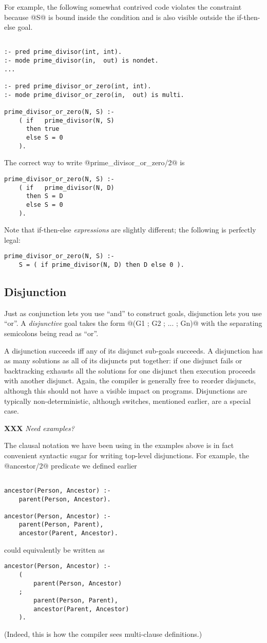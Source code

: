 \documentclass[a4paper,11pt,notitlepage,onecolumn]{article}
\newcommand{\XXX}[1]%
{{\small\textbf{XXX} \emph{#1}}}
\begin{document}
For example, the following somewhat contrived code violates
the constraint because @S@ is bound inside the condition and is
also visible outside the if-then-else goal.
\begin{verbatim}

:- pred prime_divisor(int, int).
:- mode prime_divisor(in,  out) is nondet.
...

:- pred prime_divisor_or_zero(int, int).
:- mode prime_divisor_or_zero(in,  out) is multi.

prime_divisor_or_zero(N, S) :-
    ( if   prime_divisor(N, S)
      then true
      else S = 0
    ).

\end{verbatim}
The correct way to write @prime_divisor_or_zero/2@ is
\begin{verbatim}
prime_divisor_or_zero(N, S) :-
    ( if   prime_divisor(N, D)
      then S = D
      else S = 0
    ).
\end{verbatim}
Note that if-then-else \emph{expressions} are slightly different;
the following is perfectly legal:
\begin{verbatim}
prime_divisor_or_zero(N, S) :-
    S = ( if prime_divisor(N, D) then D else 0 ).
\end{verbatim}

\subsection{Disjunction}

Just as conjunction lets you use ``and'' to construct goals,
disjunction lets you use ``or''.  A \emph{disjunctive} goal takes the
form @(G1 ; G2 ; ... ; Gn)@ with the separating semicolons being
read as ``or''.

A disjunction succeeds iff any of its disjunct sub-goals
succeeds.  A disjunction has as many solutions as all of its
disjuncts put together: if one disjunct fails or backtracking
exhausts all the solutions for one disjunct then execution
proceeds with another disjunct.  Again, the compiler is
generally free to reorder disjuncts, although this should not
have a visible impact on programs.  Disjunctions are typically
non-deterministic, although switches, mentioned earlier, are a
special case.

\XXX{Need examples?}

The clausal notation we have been using in the examples above
is in fact convenient syntactic sugar for writing top-level
disjunctions.  For example, the @ancestor/2@ predicate we
defined earlier
\begin{verbatim}

ancestor(Person, Ancestor) :-
    parent(Person, Ancestor).

ancestor(Person, Ancestor) :-
    parent(Person, Parent),
    ancestor(Parent, Ancestor).
\end{verbatim}
could equivalently be written as
\begin{verbatim}
ancestor(Person, Ancestor) :-
    (
        parent(Person, Ancestor)
    ;
        parent(Person, Parent),
        ancestor(Parent, Ancestor)
    ).
\end{verbatim}
(Indeed, this is how the compiler sees multi-clause
definitions.)
\end{document}
